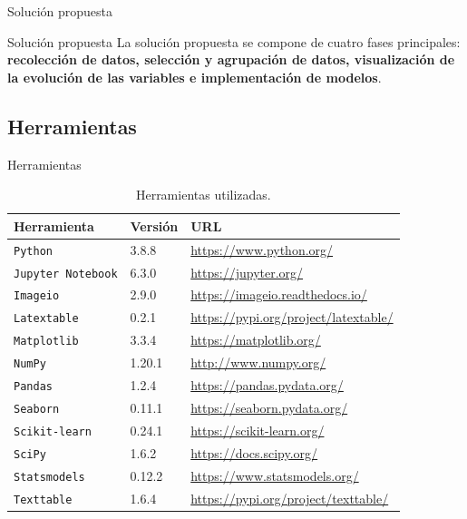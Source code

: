 \documentclass[11pt]{beamer}
\begin{document}
\begin{frame}{Solución propuesta}
\begin{block}{Solución propuesta} \justifying
La solución propuesta se compone de cuatro fases principales: \textbf{recolección de datos, selección y agrupación de datos, visualización de la evolución de las variables e implementación de modelos}.
\end{block}
\end{frame}
\subsection{Herramientas}
\begin{frame}{Herramientas}
\begin{table}[H]
{\centering
	\caption{Herramientas utilizadas.}
	\begin{adjustbox}{width=0.9\textwidth}
	\begin{tabular}{|l|l|l|}
		\hline 
		Herramienta & Versión & URL\\
			\hline
			\texttt{Python} & 3.8.8 & \url{https://www.python.org/}\\
			\hline
			\texttt{Jupyter Notebook} & 6.3.0 & \url{https://jupyter.org/}\\
			\hline
			\texttt{Imageio} & 2.9.0 & \url{https://imageio.readthedocs.io/}\\
			\hline
			\texttt{Latextable} & 0.2.1 & \url{https://pypi.org/project/latextable/}\\
			\hline
			\texttt{Matplotlib} & 3.3.4 & \url{https://matplotlib.org/}\\
			\hline
			\texttt{NumPy} & 1.20.1 & \url{http://www.numpy.org/}\\
			\hline
			\texttt{Pandas} & 1.2.4 & \url{https://pandas.pydata.org/}\\
			\hline
			\texttt{Seaborn} & 0.11.1 & \url{https://seaborn.pydata.org/}\\
			\hline
			\texttt{Scikit-learn} & 0.24.1 & \url{https://scikit-learn.org/}\\
			\hline
			\texttt{SciPy} & 1.6.2 & \url{https://docs.scipy.org/}\\
			\hline
			\texttt{Statsmodels} & 0.12.2 & \url{https://www.statsmodels.org/}\\
			\hline
			\texttt{Texttable} & 1.6.4 & \url{https://pypi.org/project/texttable/}\\
			\hline
		\end{tabular}
		\end{adjustbox}
	\label{tab:Herramientas utilizadas}
	}
\end{table}
\end{frame}
\end{document}
